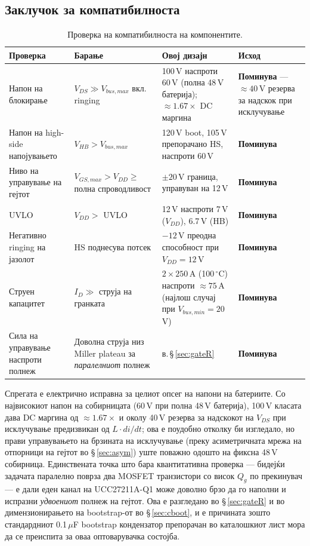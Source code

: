 \documentclass[11pt,a4paper]{article}
\newcommand{\eng}[1]{\textenglish{#1}}
\begin{document}
\subsection{Заклучок за компатибилноста}

\begin{table}[h]
\centering
\caption{Проверка на компатибилноста на компонентите.}
\begin{tabularx}{\textwidth}{@{}L L L >{\RaggedRight\arraybackslash}p{2.1cm}@{}}
\toprule
\textbf{Проверка} & \textbf{Барање} & \textbf{Овој дизајн} & \textbf{Исход} \\
\midrule
Напон на блокирање & $V_{DS} \gg V_{bus,max}$ вкл.\,\eng{ringing} & 100\,V наспроти 60\,V (полна 48\,V батерија); $\approx 1.67\times$ DC маргина & \textbf{Поминува} --- $\approx 40$\,V резерва за надскок при исклучување \cite{ref1} \\
Напон на \eng{high-side} напојувањето & $V_{HB} > V_{bus,max}$ & 120\,V \eng{boot}, 105\,V препорачано HS, наспроти 60\,V & \textbf{Поминува} \cite{ref3} \\
Ниво на управување на гејтот & $V_{GS,max} > V_{DD} \ge$ полна спроводливост & $\pm 20$\,V граница, управуван на 12\,V & \textbf{Поминува} \cite{ref1,ref3} \\
UVLO & $V_{DD} >$ UVLO & 12\,V наспроти 7\,V ($V_{DD}$), 6.7\,V (HB) & \textbf{Поминува} \cite{ref3} \\
Негативно \eng{ringing} на јазолот & HS поднесува потсек & $-12$\,V преодна способност при $V_{DD}=12$\,V & \textbf{Поминува} \cite{ref3} \\
Струен капацитет & $I_D \gg$ струја на гранката & $2\times 250$\,A (100\,$^\circ$C) наспроти $\approx 75$\,A (најлош случај при $V_{bus,min}=20$\,V) & \textbf{Поминува} \cite{ref1} \\
Сила на управување наспроти полнеж & Доволна струја низ \eng{Miller plateau} за \emph{паралелниот} полнеж & в.\,\S\,\ref{sec:gateR} & \textbf{Поминува} \\
\bottomrule
\end{tabularx}
\end{table}

\noindent
Спрегата е електрично исправна за целиот опсег на напони на батериите. Со највисокиот напон на собирницата (60\,V при полна 48\,V батерија), 100\,V класата дава DC маргина од $\approx 1.67\times$ и околу 40\,V резерва за надскокот на $V_{DS}$ при исклучување предизвикан од $L\cdot di/dt$; ова е поудобно отколку би изгледало, но прави управувањето на брзината на исклучување (преку асиметричната мрежа на отпорници на гејтот во \S\,\ref{sec:asym}) уште поважно одошто на фиксна 48\,V собирница. Единствената точка што бара квантитативна проверка --- бидејќи задачата паралелно поврза два MOSFET транзистори со висок $Q_g$ по прекинувач --- е дали еден канал на UCC27211A-Q1 може доволно брзо да го наполни и испразни \emph{удвоениот} полнеж на гејтот. Ова е разгледано во \S\,\ref{sec:gateR} и во димензионирањето на \eng{bootstrap}-от во \S\,\ref{sec:cboot}, и е причината зошто стандардниот 0.1\,$\mu$F \eng{bootstrap} кондензатор препорачан во каталошкиот лист мора да се преиспита за оваа оптоварувачка состојба.
\end{document}

